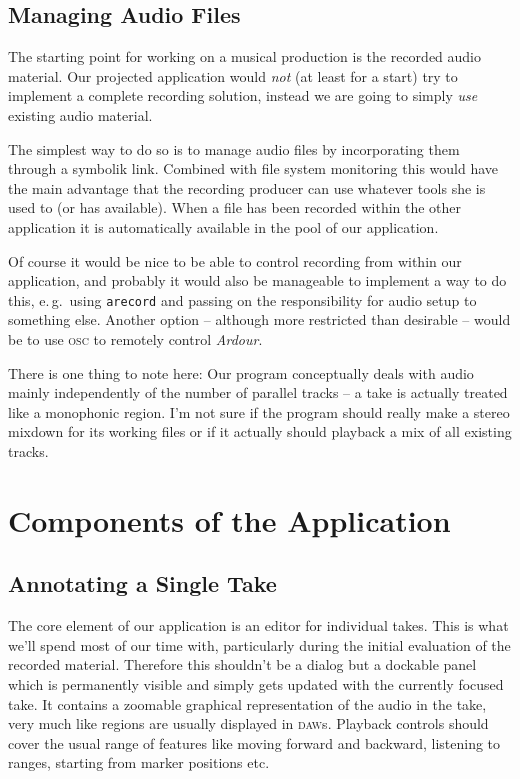 \documentclass[11pt,a4paper]{article}
\begin{document}
\subsection{Managing Audio Files}

The starting point for working on a musical production is the recorded audio
material.
Our projected application would \emph{not} (at least for a start) try to
implement a complete recording solution, instead we are going to simply
\emph{use} existing audio material.

The simplest way to do so is to manage audio files by incorporating them through
a symbolik link.
Combined with file system monitoring this would have the main advantage that the
recording producer can use whatever tools she is used to (or has available).
When a file has been recorded within the other application it is automatically
available in the pool of our application.

Of course it would be nice to be able to control recording from within our
application, and probably it would also be manageable to implement a way to do
this, e.\,g.\ using \texttt{arecord} and passing on the responsibility for audio
setup to something else.
Another option -- although more restricted than desirable -- would be to use
\textsc{osc} to remotely control \emph{Ardour}.

There is one thing to note here: Our program conceptually deals with audio
mainly independently of the number of parallel tracks -- a take is actually treated like
a monophonic region.
I'm not sure if the program should really make a stereo mixdown for its working
files or if it actually should playback a mix of all existing tracks.

\section{Components of the Application}

\subsection{Annotating a Single Take}
The core element of our application is an editor for individual takes.
This is what we'll spend most of our time with, particularly during the initial
evaluation of the recorded material.
Therefore this shouldn't be a dialog but a dockable panel which is permanently
visible and simply gets updated with the currently focused take.
It contains a zoomable graphical representation of the audio in the take, very
much like regions are usually displayed in \textsc{daw}s.
Playback controls should cover the usual range of features like moving forward
and backward, listening to ranges, starting from marker positions etc.
\end{document}
